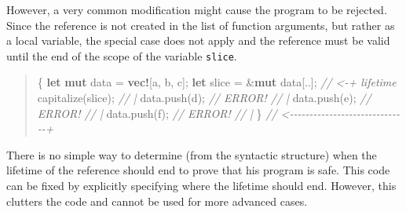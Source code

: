 \documentclass[
  11pt,
  twoside]{report}
\newenvironment{Shaded}{}{}
\newcommand{\CharTok}[1]{#1}
\newcommand{\CommentTok}[1]{\textit{#1}}
\newcommand{\KeywordTok}[1]{\textbf{#1}}
\newcommand{\NormalTok}[1]{#1}
\newcommand{\OperatorTok}[1]{#1}
\newcommand{\PreprocessorTok}[1]{\textbf{#1}}
\begin{document}
However, a very common modification might cause the program to be
rejected. Since the reference is not created in the list of function
arguments, but rather as a local variable, the special case does not
apply and the reference must be valid until the end of the scope of the
variable \texttt{slice}.

\begin{quote}
\begin{Shaded}
\begin{Highlighting}[]
\OperatorTok{\{}
    \KeywordTok{let} \KeywordTok{mut}\NormalTok{ data }\OperatorTok{=} \PreprocessorTok{vec!}\NormalTok{[}\CharTok{\textquotesingle{}a\textquotesingle{}}\OperatorTok{,} \CharTok{\textquotesingle{}b\textquotesingle{}}\OperatorTok{,} \CharTok{\textquotesingle{}c\textquotesingle{}}\NormalTok{]}\OperatorTok{;}
    \KeywordTok{let}\NormalTok{ slice }\OperatorTok{=} \OperatorTok{\&}\KeywordTok{mut}\NormalTok{ data[}\OperatorTok{..}\NormalTok{]}\OperatorTok{;} \CommentTok{// \textless{}{-}+ \textquotesingle{}lifetime}
\NormalTok{    capitalize(slice)}\OperatorTok{;}         \CommentTok{//   |}
\NormalTok{    data}\OperatorTok{.}\NormalTok{push(}\CharTok{\textquotesingle{}d\textquotesingle{}}\NormalTok{)}\OperatorTok{;} \CommentTok{// ERROR!  //   |}
\NormalTok{    data}\OperatorTok{.}\NormalTok{push(}\CharTok{\textquotesingle{}e\textquotesingle{}}\NormalTok{)}\OperatorTok{;} \CommentTok{// ERROR!  //   |}
\NormalTok{    data}\OperatorTok{.}\NormalTok{push(}\CharTok{\textquotesingle{}f\textquotesingle{}}\NormalTok{)}\OperatorTok{;} \CommentTok{// ERROR!  //   |}
\OperatorTok{\}} \CommentTok{// \textless{}{-}{-}{-}{-}{-}{-}{-}{-}{-}{-}{-}{-}{-}{-}{-}{-}{-}{-}{-}{-}{-}{-}{-}{-}{-}{-}{-}{-}{-}{-}+}
\end{Highlighting}
\end{Shaded}
\end{quote}

There is no simple way to determine (from the syntactic structure) when
the lifetime of the reference should end to prove that his program is
safe. This code can be fixed by explicitly specifying where the lifetime
should end. However, this clutters the code and cannot be used for more
advanced cases.
\end{document}
